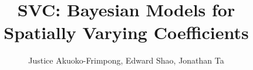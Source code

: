 



\addtolength{\oddsidemargin}{-.5in}%
\addtolength{\evensidemargin}{-1in}%
\addtolength{\textwidth}{1in}%
\addtolength{\textheight}{1.7in}%
\addtolength{\topmargin}{-1in}%



\def\spacingset#1{\renewcommand{\baselinestretch}%
{#1}\small\normalsize} \spacingset{1}

\date{}

\newcommand{\footremember}[2]{%
    \footnote{#2}
    \newcounter{#1}
    \setcounter{#1}{\value{footnote}}%
}
\newcommand{\footrecall}[1]{%
    \footnotemark[\value{#1}]%
} 

\newcommand{\bbE}{\mathbb{E}}
\newcommand{\bbR}{\mathbb{R}}
\newcommand{\bX}{\boldsymbol{X}}
\newcommand{\bs}{\boldsymbol{s}}
\newcommand{\bw}{\boldsymbol{w}}
\newcommand{\bc}{\boldsymbol{c}}
\newcommand{\btheta}{\boldsymbol{\theta}}
\newcommand{\wtilde}{\tilde{w}}
\newcommand{\Ytilde}{\tilde{Y}}

\newcommand{\mytitle}{SVC: Bayesian Models for Spatially Varying Coefficients}  

\title{\bf \mytitle}
\author{Justice Akuoko-Frimpong, Edward Shao, Jonathan Ta}

\maketitle


\spacingset{1.9} %


